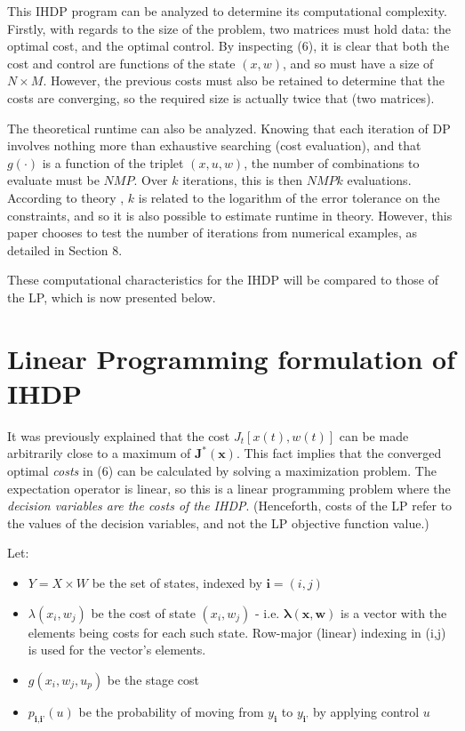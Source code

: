 \documentclass[conference]{IEEEtran}
\begin{document}
This IHDP program can be analyzed to determine its computational complexity. Firstly, with regards to the size of the problem, two matrices must hold data: the optimal cost, and the optimal control. By inspecting (6), it is clear that both the cost and control are functions of the state $(x,w)$, and so must have a size of $N\times M$. However, the previous costs must also be retained to determine that the costs are converging, so the required size is actually twice that (two matrices).

The theoretical runtime can also be analyzed. Knowing that each iteration of DP involves nothing more than exhaustive searching (cost evaluation), and that $g(\cdot)$ is a function of the triplet $(x,u,w)$, the number of combinations to evaluate must be $NMP$. Over $k$ iterations, this is then $NMPk$ evaluations. According to theory \cite{Bertsekas:2007:DPO:1396348}, $k$ is related to the logarithm of the error tolerance on the constraints, and so it is also possible to estimate runtime in theory. However, this paper chooses to test the number of iterations from numerical examples, as detailed in Section 8.

These computational characteristics for the IHDP will be compared to those of the LP, which is now presented below.


\section{Linear Programming formulation of IHDP}
It was previously explained that the cost $J_{t}[x(t),w(t)]$ can be made arbitrarily close to a maximum of $\boldsymbol{J^{*}(x)}$. This fact implies that the converged optimal \textit{costs} in (6) can be calculated by solving a maximization problem. The expectation operator is linear, so this is a linear programming problem where the \textit{decision variables are the costs of the IHDP}. (Henceforth, costs of the LP refer to the values of the decision variables, and not the LP objective function value.)

Let:
\begin{itemize}
	\item $Y = X\times W$ be the set of states, indexed by $\textbf{i}=(i,j)$
	\item $\lambda(x_{i},w_{j})$ be the cost of state $(x_{i},w_{j})$ - i.e. $\boldsymbol{\lambda(x,w)}$ is a vector with the elements being costs for each such state. Row-major (linear) indexing in (i,j) is used for the vector's elements.
	\item $g(x_{i},w_{j},u_{p})$ be the stage cost
	\item $p_{\textbf{i},\textbf{i'}}(u)$ be the probability of moving from $y_{\textbf{i}}$ to $y_{\textbf{i'}}$ by applying control $u$
\end{itemize}
\end{document}
